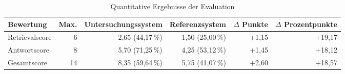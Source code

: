 \begin{table}[bht]
\centering
\caption{Quantitative Ergebnisse der Evaluation}
\label{tab:evaluation_summary}
\begin{tabular}{lrrrrr}
\toprule
\textbf{Bewertung} &
\textbf{Max.} &
\textbf{Untersuchungssystem} &
\textbf{Referenzsystem} &
\textbf{$\Delta$ Punkte} &
\textbf{$\Delta$ Prozentpunkte} \\
\midrule
Retrievalscore & 6 & 2{,}65 (44{,}17\,\%) & 1{,}50 (25{,}00\,\%) & +1{,}15 & +19{,}17 \\
Antwortscore & 8 & 5{,}70 (71{,}25\,\%) & 4{,}25 (53{,}12\,\%) & +1{,}45 & +18{,}12 \\
Gesamtscore & 14 & 8{,}35 (59{,}64\,\%) & 5{,}75 (41{,}07\,\%) & +2{,}60 & +18{,}57 \\
\bottomrule
\end{tabular}
\end{table}
